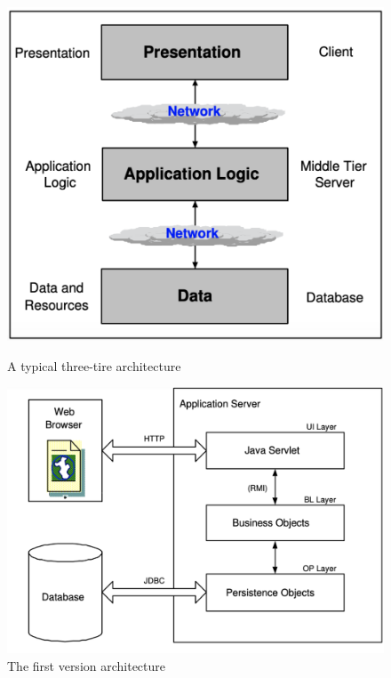\begin{figure}[!h]
\center
\begin{minipage}{0.45\linewidth}
\center
\captionsetup{justification=centering,margin=0cm,font= small}
\includegraphics[width=0.85\linewidth]{img/cap2/webTierarch}
\caption{ A typical three-tire architecture \cite{sun2003} } \label{subfig:webTierarch}
\end{minipage}
\begin{minipage}{0.45\linewidth}
\center
\captionsetup{justification=centering,margin=0cm,font= small}
\includegraphics[width=1.05\linewidth]{img/cap2/firstWebArch}
\caption{ The first version architecture \cite{sun2003}} \label{subfig:firstWebArch}
\end{minipage}
\end{figure}

